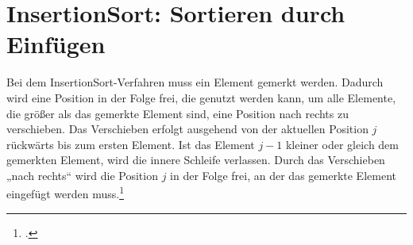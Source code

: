 \documentclass{lehramt-informatik-haupt}
\begin{document}

\chapter{InsertionSort: Sortieren durch Einfügen}

\begin{liQuellen}
\item \cite[Seite 41]{aud:fs:tafeluebung-11}
\item \cite{wiki:insertionsort}
\item \cite[Seite 125-127 (PDF 143-145)]{saake}
\end{liQuellen}

Bei dem InsertionSort-Verfahren muss ein Element gemerkt werden. Dadurch
wird eine Position in der Folge frei, die genutzt werden kann, um alle
Elemente, die größer als das gemerkte Element sind, eine Position nach
rechts zu verschieben. Das Verschieben erfolgt ausgehend von der
aktuellen Position $j$ rückwärts bis zum ersten Element. Ist das Element
$j - 1$ kleiner oder gleich dem gemerkten Element, wird die innere
Schleife verlassen. Durch das Verschieben „nach rechts“ wird die
Position $j$ in der Folge frei, an der das gemerkte Element eingefügt
werden muss.\footcite[Seite 125]{saake}

\def\pfeil#1#2{\draw[-latex] ([xshift=1mm]a.#1 north) -- ++(0,0.25) -| ([xshift=-1mm]a.#2 north);}


\end{document}
